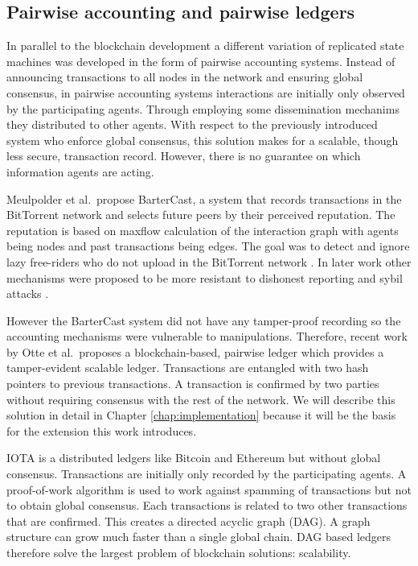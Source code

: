 \subsection{Pairwise accounting and pairwise ledgers}
In parallel to the blockchain development a different variation of replicated state machines was 
developed in the form of pairwise accounting systems. Instead of announcing transactions to all 
nodes in the network and ensuring global consensus, in pairwise accounting systems interactions are
initially only observed by the participating agents. Through employing some dissemination mechanims they 
distributed to other agents. With respect to the previously introduced system who enforce global 
consensus, this solution makes for a scalable, though less secure, transaction record. However, there is no 
guarantee on which information agents are acting.

Meulpolder et al.\ propose BarterCast, a system that records transactions in the BitTorrent network
and selects future peers by their perceived reputation. The reputation is based on maxflow 
calculation of the interaction graph with agents being nodes and past transactions being edges. The
goal was to detect and ignore lazy free-riders who do not upload in the BitTorrent network \cite{meulpolder2009bartercast}.
In later work other mechanisms were proposed to be more resistant to dishonest reporting and sybil
attacks \cite{seuken2010accounting, seuken2014sybil}.

However the BarterCast system did not have any tamper-proof recording so the accounting mechanisms were
vulnerable to manipulations. Therefore, recent work by Otte et al.\ proposes a blockchain-based, pairwise
ledger which provides a tamper-evident scalable ledger. Transactions are 
entangled with two hash pointers to previous transactions. A transaction is confirmed by two parties
without requiring consensus with the rest of the network. We will describe this solution in detail 
in Chapter \ref{chap:implementation} because it will be the basis for the extension this work
introduces. 

IOTA\cite{popov2016tangle} is a distributed ledgers like Bitcoin and Ethereum but without global 
consensus. Transactions are initially only recorded by the participating agents. A proof-of-work 
algorithm is used to work against spamming of transactions but not to obtain global consensus. Each
transactions is related to two other transactions that are confirmed. This creates a directed 
acyclic graph (DAG). A graph structure can grow much faster than a single global chain. DAG based 
ledgers therefore solve the largest problem of blockchain solutions: scalability.

